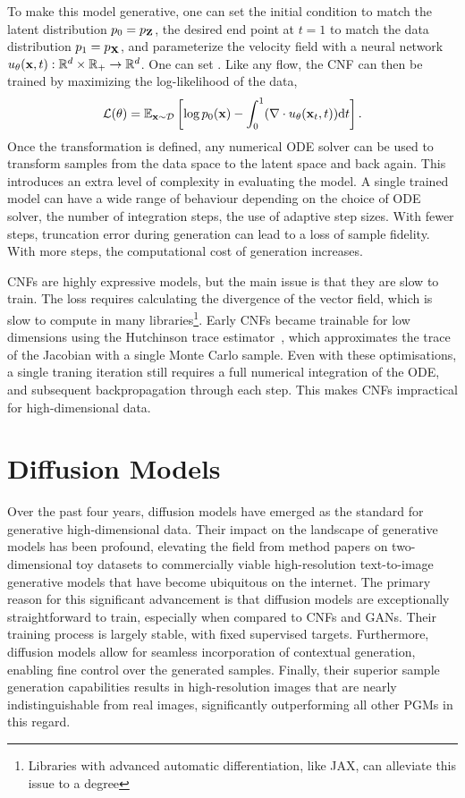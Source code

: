 To make this model generative, one can set the initial condition to match the latent distribution $p_0 = p_{\mathbf{Z}}$, the desired end point at $t = 1$ to match the data distribution $p_1 = p_{\mathbf{X}}$, and parameterize the velocity field with a neural network $u_\theta(\mathbf{x}, t): \mathbb{R}^d \times \mathbb{R}_{+} \rightarrow \mathbb{R}^d$.
One can set .
Like any flow, the CNF can then be trained by maximizing the log-likelihood of the data,
\begin{equation}
    \label{eq:cnf_loss}
    \mathcal{L}(\theta) = \mathbb{E}_{\mathbf{x} \sim \mathcal{D}}\left[\log p_0(\mathbf{x}) - \int_0^1 (\nabla \cdot u_\theta(\mathbf{x}_t, t)) \mathrm{d} t\right].
\end{equation}
Once the transformation is defined, any numerical ODE solver can be used to transform samples from the data space to the latent space and back again.
This introduces an extra level of complexity in evaluating the model.
A single trained model can have a wide range of behaviour depending on the choice of ODE solver, the number of integration steps, the use of adaptive step sizes.
With fewer steps, truncation error during generation can lead to a loss of sample fidelity.
With more steps, the computational cost of generation increases.

CNFs are highly expressive models, but the main issue is that they are slow to train.
The loss requires calculating the divergence of the vector field, which is slow to compute in many libraries\footnote{Libraries with advanced automatic differentiation, like JAX\cite{JAX}, can alleviate this issue to a degree}.
Early CNFs became trainable for low dimensions using the Hutchinson trace estimator~\cite{FFJORD}, which approximates the trace of the Jacobian with a single Monte Carlo sample.
Even with these optimisations, a single traning iteration still requires a full numerical integration of the ODE, and subsequent backpropagation through each step.
This makes CNFs impractical for high-dimensional data.

\section{Diffusion Models}

Over the past four years, diffusion models have emerged as the standard for generative high-dimensional data.
Their impact on the landscape of generative models has been profound, elevating the field from method papers on two-dimensional toy datasets to commercially viable high-resolution text-to-image generative models that have become ubiquitous on the internet.
The primary reason for this significant advancement is that diffusion models are exceptionally straightforward to train, especially when compared to CNFs and GANs.
Their training process is largely stable, with fixed supervised targets.
Furthermore, diffusion models allow for seamless incorporation of contextual generation, enabling fine control over the generated samples.
Finally, their superior sample generation capabilities results in high-resolution images that are nearly indistinguishable from real images, significantly outperforming all other PGMs in this regard.

